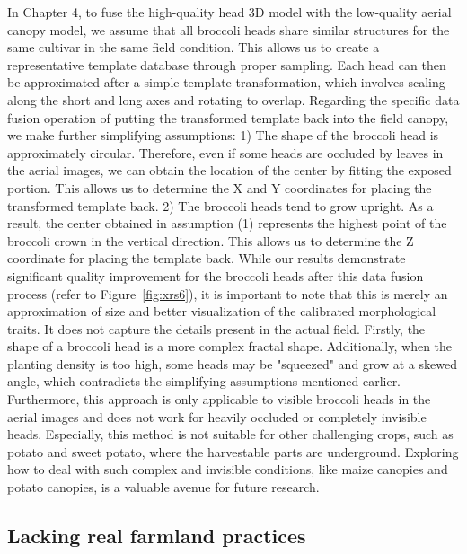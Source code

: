   In Chapter 4, to fuse the high-quality head 3D model with the low-quality aerial canopy model, we assume that all broccoli heads share similar structures for the same cultivar in the same field condition. 
  This allows us to create a representative template database through proper sampling. 
  Each head can then be approximated after a simple template transformation, which involves scaling along the short and long axes and rotating to overlap. 
  Regarding the specific data fusion operation of putting the transformed template back into the field canopy, we make further simplifying assumptions: 
  1) The shape of the broccoli head is approximately circular. 
  Therefore, even if some heads are occluded by leaves in the aerial images, we can obtain the location of the center by fitting the exposed portion. 
  This allows us to determine the X and Y coordinates for placing the transformed template back. 
  2) The broccoli heads tend to grow upright. 
  As a result, the center obtained in assumption (1) represents the highest point of the broccoli crown in the vertical direction. 
  This allows us to determine the Z coordinate for placing the template back. 
  While our results demonstrate significant quality improvement for the broccoli heads after this data fusion process (refer to Figure~\ref{fig:xrs6}), it is important to note that this is merely an approximation of size and better visualization of the calibrated morphological traits. 
  It does not capture the details present in the actual field. 
  Firstly, the shape of a broccoli head is a more complex fractal shape. Additionally, when the planting density is too high, some heads may be "squeezed" and grow at a skewed angle, which contradicts the simplifying assumptions mentioned earlier. 
  Furthermore, this approach is only applicable to visible broccoli heads in the aerial images and does not work for heavily occluded or completely invisible heads. 
  Especially, this method is not suitable for other challenging crops, such as potato and sweet potato, where the harvestable parts are underground. 
  Exploring how to deal with such complex and invisible conditions, like maize canopies and potato canopies, is a valuable avenue for future research.

\subsection{Lacking real farmland practices} \label{sec:lackvlid}

